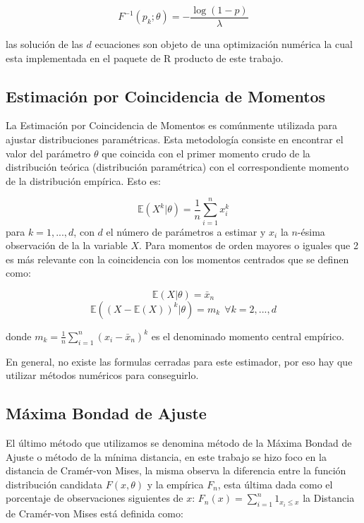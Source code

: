 \documentclass[]{article}
\begin{document}
\[F^{-1}(p_k;\theta)=-\frac{\log(1-p)}{\lambda}\]

las solución de las \(d\) ecuaciones son objeto de una optimización
numérica la cual esta implementada en el paquete de R producto de este
trabajo.

\hypertarget{estimacion-por-coincidencia-de-momentos}{%
\subsection{Estimación por Coincidencia de
Momentos}\label{estimacion-por-coincidencia-de-momentos}}

La Estimación por Coincidencia de Momentos es comúnmente utilizada para
ajustar distribuciones paramétricas. Esta metodología consiste en
encontrar el valor del parámetro \(\theta\) que coincida con el primer
momento crudo de la distribución teórica (distribución paramétrica) con
el correspondiente momento de la distribución empírica. Esto es:

\[\mathbb{E}(X^{k}|\theta)=\frac{1}{n}\sum_{i=1}^{n}x_{i}^{k}\] para
\(k=1,...,d\), con \(d\) el número de parámetros a estimar y \(x_i\) la
\(n\)-ésima observación de la la variable \(X\). Para momentos de orden
mayores o iguales que 2 es más relevante con la coincidencia con los
momentos centrados que se definen como:

\[\mathbb{E}(X|\theta)=\bar{x}_{n}\]
\[\mathbb{E}((X-\mathbb{E}(X))^{k}|\theta)=m_k~~\forall k=2,...,d\]

donde \(m_k=\frac{1}{n}\sum_{i=1}^{n}(x_i-\bar{x}_n)^k\) es el
denominado momento central empírico.

En general, no existe las formulas cerradas para este estimador, por eso
hay que utilizar métodos numéricos para conseguirlo.

\hypertarget{maxima-bondad-de-ajuste}{%
\subsection{Máxima Bondad de Ajuste}\label{maxima-bondad-de-ajuste}}

El último método que utilizamos se denomina método de la Máxima Bondad
de Ajuste o método de la mínima distancia, en este trabajo se hizo foco
en la distancia de Cramér-von Mises, la misma observa la diferencia
entre la función distribución candidata \(F(x,\theta)\) y la empírica
\(F_n\), esta última dada como el porcentaje de observaciones siguientes
de \(x\): \(F_n(x)=\sum_{i=1}^{n}1_{x_i\leq x}\) la Distancia de
Cramér-von Mises está definida como:
\end{document}
